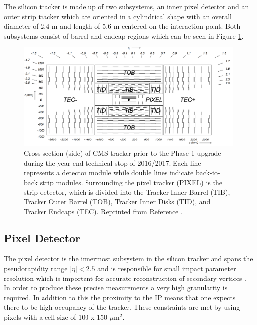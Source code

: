 The silicon tracker is made up of two subsystems, an inner pixel detector and an outer strip tracker which are oriented in a cylindrical shape with an overall diameter of 2.4 m and length of 5.6 m centered on the interaction point.  Both subsystems consist of barrel and endcap regions which can be seen in Figure \ref{fig:trackerlayoutv2}.  

\begin{figure}[h]
	\centering
	\includegraphics[width=0.7\linewidth]{Figures/TrackerLayout_v2}
	\caption{Cross section (side) of CMS tracker prior to the Phase 1 upgrade during the year-end technical stop of 2016/2017. Each line represents a detector module while double lines indicate back-to-back strip modules. Surrounding the pixel tracker (PIXEL) is the strip detector, which is divided into the Tracker Inner Barrel (TIB), Tracker Outer Barrel (TOB), Tracker Inner Disks (TID), and Tracker Endcaps (TEC). Reprinted from Reference \cite{Chatrchyan:1704291}.}
	\label{fig:trackerlayoutv2}
\end{figure}

\subsection{Pixel Detector}
The pixel detector is the innermost subsystem in the silicon tracker and spans the pseudorapidity range $|\eta|< 2.5$ and is responsible for small impact parameter resolution which is important for accurate reconstruction of secondary vertices \cite{Collaboration_2008}.  In order to produce these precise measurements a very high granularity is required.  In addition to this the proximity to the IP means that one expects there to be high occupancy of the tracker.  These constraints are met by using pixels with a cell size of 100 x 150 $\mu$m$^{2}$.  

